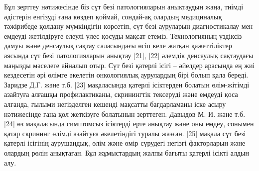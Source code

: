 \begin{multicols}{2}
Бұл зерттеу нәтижесінде біз сүт безі патологияларын анықтаудың жаңа,
тиімді әдістерін енгізуді ғана көздеп қоймай, сондай-ақ олардың
медициналық тәжірибеде қолдану мүмкіндігін көрсетіп, сүт безі ауруларын
диагностикалау мен емдеуді жетілдіруге елеулі үлес қосуды мақсат етеміз.
Технологияның үздіксіз дамуы және денсаулық сақтау саласындағы өсіп келе
жатқан қажеттіліктер аясында сүт безі патологияларын анықтау {[}21{]},
{[}22{]} әлемдік денсаулық сақтаудағы маңызды мәселеге айналып отыр. Сүт
безі қатерлі ісігі -- әйелдер арасында ең жиі кездесетін әрі өлімге
әкелетін онкологиялық аурулардың бірі болып қала береді. Заридзе Д.Г.
және т.б. {[}23{]} мақаласында қатерлі ісіктерден болатын өлім-жітімді
азайтуға алғашқы профилактиканы, скринингтік тексеруді және емдеуді қоса
алғанда, ғылыми негізделген кешенді мақсатты бағдарламаны іске асыру
нәтижесінде ғана қол жеткізуге болатынын зерттеген. Давыдов М. И. және
т.б. {[}24{]} өз мақаласында симптомсыз ісіктерді ерте анықтау және оны
емдеу, сонымен қатар скрининг өлімді азайтуға әкелетіндігі туралы
жазған. {[}25{]} мақала сүт безі қатерлі ісігінің аурушаңдық, өлім және
өмір сүрудегі негізгі факторларын және олардың рөлін анықтаған. Бұл
жұмыстардың жалпы бағыты қатерлі ісікті алдын алу.


\end{multicols}
